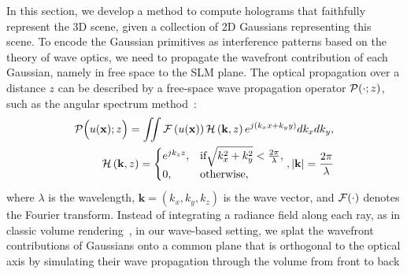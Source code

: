 In this section, we develop a method to compute holograms that faithfully represent the 3D scene, given a collection of 2D Gaussians representing this scene. To encode the Gaussian primitives as interference patterns based on the theory of wave optics, we need to propagate the wavefront contribution of each Gaussian, namely  in free space to the SLM plane. The optical propagation over a distance $z$ can be described by a free-space wave propagation operator $\mathcal{P}(\cdot; z)$, such as the angular spectrum method~\cite{goodman2005introduction, matsushima2009band}:
\begin{align}
    \mathcal{P}\Big(u(\mathbf{x} ); z\Big) = \iint \mathcal{F} \left( u(\mathbf{x} )\right) \mathcal{H} \left( \mathbf{k}, z \right) e^{j \left(k_x x + k_y y \right)} d k_x d k_y, \\
    \mathcal{H} \left( \mathbf{k}, z \right) = \begin{cases}
        e^{j k_z z}, & \text{if} \sqrt{k_x^2 + k_y^2} < \frac{2\pi}{
        \lambda},\\
        0, & \text{otherwise},
    \end{cases}, |\mathbf{k}| = \frac{2\pi}{\lambda}
    \label{eq:asm}
\end{align}
where $\lambda$ is the wavelength, $\mathbf{k} = (k_x, k_y, k_z)$ is the wave vector, and $\mathcal{F}(\cdot)$ denotes the Fourier transform. Instead of integrating a radiance field along each ray, as in classic volume rendering~\cite{kajiya1984ray}, in our wave-based setting, we splat the wavefront contributions of Gaussians onto a common plane that is orthogonal to the optical axis by simulating their wave propagation through the volume from front to back
%

